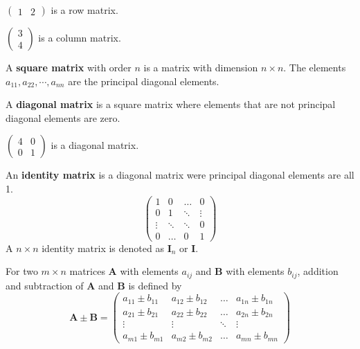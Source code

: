 \documentclass{huhtakm-template-book}
\begin{document}
\begin{eg}
    $\begin{pmatrix}
        1 & 2
    \end{pmatrix}$ is a row matrix.
\end{eg}
\begin{eg}
    $\begin{pmatrix}
        3\\
        4
    \end{pmatrix}$ is a column matrix.
\end{eg}
\begin{defn}
    A \textbf{square matrix} with order $n$ is a matrix with dimension $n\times n$. The elements $a_{11},a_{22},\cdots,a_{nn}$ are the principal diagonal elements.
\end{defn}
\begin{defn}
    A \textbf{diagonal matrix} is a square matrix where elements that are not principal diagonal elements are zero.
\end{defn}
\begin{eg}
    $\begin{pmatrix}
        4 & 0\\
        0 & 1
    \end{pmatrix}$ is a diagonal matrix.
\end{eg}
\newpage
\begin{defn}
    An \textbf{identity matrix} is a diagonal matrix were principal diagonal elements are all 1.
    \begin{equation*}
        \begin{pmatrix}
            1 & 0 & \hdots & 0\\
            0 & 1 & \ddots & \vdots\\
            \vdots & \ddots & \ddots & 0\\
            0 & \hdots & 0 & 1
        \end{pmatrix}
    \end{equation*}
    A $n\times n$ identity matrix is denoted as $\mathbf{I}_{n}$ or $\mathbf{I}$.
\end{defn}
\begin{defn}
    For two $m\times n$ matrices $\mathbf{A}$ with elements $a_{ij}$ and $\mathbf{B}$ with elements $b_{ij}$, addition and subtraction of $\mathbf{A}$ and $\mathbf{B}$ is defined by
    \begin{equation*}
        \mathbf{A}\pm \mathbf{B}=\begin{pmatrix}
            a_{11}\pm b_{11} & a_{12}\pm b_{12} & \hdots & a_{1n}\pm b_{1n}\\
            a_{21}\pm b_{21} & a_{22}\pm b_{22} & \hdots & a_{2n}\pm b_{2n}\\
            \vdots & \vdots & \ddots & \vdots\\
            a_{m1}\pm b_{m1} & a_{m2}\pm b_{m2} & \hdots & a_{mn}\pm b_{mn}
        \end{pmatrix}
    \end{equation*}
\end{defn}
\end{document}
